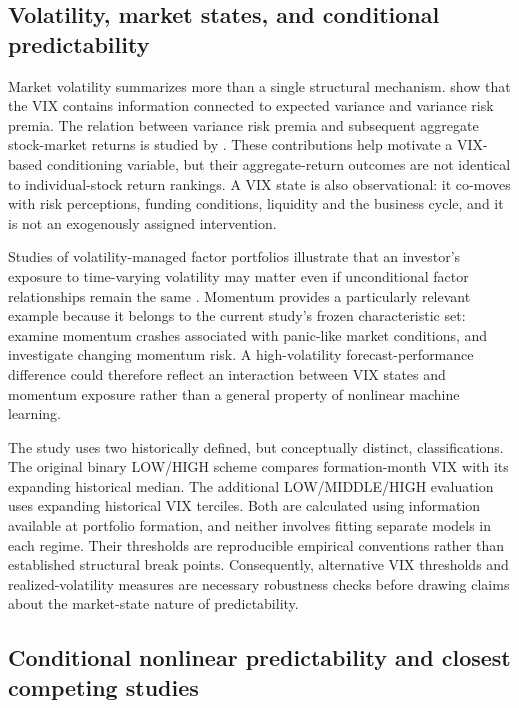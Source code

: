\subsection{Volatility, market states, and conditional predictability}
\label{subsec:literature-volatility}

Market volatility summarizes more than a single structural mechanism.
\cite{BekaertHoerova2014} show that the VIX contains information connected
to expected variance and variance risk premia. The relation between
variance risk premia and subsequent aggregate stock-market returns is
studied by \cite{BollerslevTauchenZhou2009}. These contributions help
motivate a VIX-based conditioning variable, but their aggregate-return
outcomes are not identical to individual-stock return rankings.
A VIX state is also observational: it co-moves with risk perceptions,
funding conditions, liquidity and the business cycle, and it is not an
exogenously assigned intervention.

Studies of volatility-managed factor portfolios illustrate that an investor's
exposure to time-varying volatility may matter even if unconditional factor
relationships remain the same \citep{MoreiraMuir2017}.
Momentum provides a particularly relevant example because it belongs to
the current study's frozen characteristic set:
\cite{DanielMoskowitz2016} examine momentum crashes associated with
panic-like market conditions, and \cite{BarrosoSantaClara2015}
investigate changing momentum risk. A high-volatility forecast-performance
difference could therefore reflect an interaction between VIX states and
momentum exposure rather than a general property of nonlinear machine
learning.

The study uses two historically defined, but conceptually distinct,
classifications. The original binary LOW/HIGH scheme compares formation-month
VIX with its expanding historical median. The additional LOW/MIDDLE/HIGH
evaluation uses expanding historical VIX terciles. Both are calculated using
information available at portfolio formation, and neither involves fitting
separate models in each regime. Their thresholds are reproducible empirical
conventions rather than established structural break points. Consequently,
alternative VIX thresholds and realized-volatility measures are necessary
robustness checks before drawing claims about the market-state nature of
predictability.

\subsection{Conditional nonlinear predictability and closest competing studies}
\label{subsec:literature-closest}

